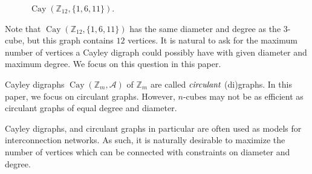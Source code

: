 \documentclass[11pt]{article}
\theoremstyle{definition}
\def\Z{\mbox{$\mathbb Z$}}
\def\Cay{\operatorname{Cay}}
\begin{document}
\begin{figure}[h]
\begin{center}\scriptsize
{}
\caption{ $\Cay(\Z_{12}, \{1, 6, 11\})$.}
\end{center}
\end{figure}

Note that $\Cay(\Z_{12}, \{1, 6, 11\})$ has the same diameter and degree as the $3$-cube, but this graph contains $12$ vertices.  It is natural to ask for the maximum number of vertices a Cayley digraph could possibly have with given diameter and maximum degree.  We focus on this question in this paper.

Cayley digraphs $\Cay(\Z_{m},\mathscr A)$ of $\Z_{m}$ are called $\emph{circulant}$ (di)graphs.  In this paper, we focus on circulant graphs.  However, $n$-cubes may not be as efficient as circulant graphs of equal degree and diameter.  

 Cayley digraphs, and circulant graphs in particular are often used as models for interconnection networks. As such, it is naturally desirable to maximize the number of vertices which can be connected with constraints on diameter and degree.
\end{document}
